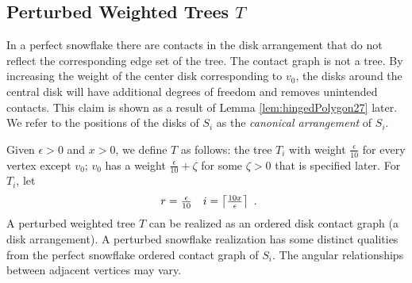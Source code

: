 
\subsection{Perturbed Weighted Trees $T$}
In a perfect snowflake there are contacts in the disk arrangement that do not reflect the corresponding edge set of the tree.  
The contact graph is not a tree.
By increasing the weight of the center disk corresponding to $v_0$, the disks around the central disk will have additional degrees of freedom and removes unintended contacts.    
This claim is shown as a result of Lemma \ref{lem:hingedPolygon27} later.
We refer to the positions of the disks of $S_i$ as the \textit{canonical arrangement} of $S_i$.

Given $\epsilon > 0$ and $x >0$, we define $T$ as follows: the tree $T_i$ with weight $\frac{\epsilon}{10}$ for every vertex except $v_0$; $v_0$ has a weight $\frac{\epsilon}{10} + \zeta$ for some $\zeta>0$ that is specified later.  For $T_i$, let 
$$\begin{array}{cc}
r = \frac{\epsilon}{10}&i = \left\lceil \frac{10x}{\epsilon} \right\rceil
\end{array} .$$ 
A perturbed weighted tree $T$ can be realized as an ordered disk contact graph (a disk arrangement).  
A perturbed snowflake realization has some distinct qualities from the perfect snowflake ordered contact graph of $S_i$.    
The angular relationships between adjacent vertices may vary.
